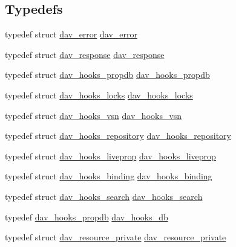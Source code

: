 \subsection*{Typedefs}
\begin{DoxyCompactItemize}
\item 
typedef struct \hyperlink{structdav__error}{dav\+\_\+error} \hyperlink{group__MOD__DAV_gaaca09776e4b1d7ae7844e1c331e4e152}{dav\+\_\+error}
\item 
typedef struct \hyperlink{structdav__response}{dav\+\_\+response} \hyperlink{group__MOD__DAV_ga2cd181241bc818bff9c2640de1e823e1}{dav\+\_\+response}
\item 
typedef struct \hyperlink{structdav__hooks__propdb}{dav\+\_\+hooks\+\_\+propdb} \hyperlink{group__MOD__DAV_gae0928279f0bc1535e8858e02527ee015}{dav\+\_\+hooks\+\_\+propdb}
\item 
typedef struct \hyperlink{structdav__hooks__locks}{dav\+\_\+hooks\+\_\+locks} \hyperlink{group__MOD__DAV_ga6693321785ea9339e16297428531d51d}{dav\+\_\+hooks\+\_\+locks}
\item 
typedef struct \hyperlink{structdav__hooks__vsn}{dav\+\_\+hooks\+\_\+vsn} \hyperlink{group__MOD__DAV_gad49c563d300f2c0c8a83916f375be9a7}{dav\+\_\+hooks\+\_\+vsn}
\item 
typedef struct \hyperlink{structdav__hooks__repository}{dav\+\_\+hooks\+\_\+repository} \hyperlink{group__MOD__DAV_ga23c20415a7a56d3ca00265c673bf3f7a}{dav\+\_\+hooks\+\_\+repository}
\item 
typedef struct \hyperlink{structdav__hooks__liveprop}{dav\+\_\+hooks\+\_\+liveprop} \hyperlink{group__MOD__DAV_ga866619ce3e7106716a7b418dc491b2f4}{dav\+\_\+hooks\+\_\+liveprop}
\item 
typedef struct \hyperlink{structdav__hooks__binding}{dav\+\_\+hooks\+\_\+binding} \hyperlink{group__MOD__DAV_gaf0e1094c9919b7bde611cbb9e2456f4e}{dav\+\_\+hooks\+\_\+binding}
\item 
typedef struct \hyperlink{structdav__hooks__search}{dav\+\_\+hooks\+\_\+search} \hyperlink{group__MOD__DAV_ga2506c1080f7dd94c91e54173fd51b586}{dav\+\_\+hooks\+\_\+search}
\item 
typedef \hyperlink{structdav__hooks__propdb}{dav\+\_\+hooks\+\_\+propdb} \hyperlink{group__MOD__DAV_gafb40434fe70df3d6b814d00757680507}{dav\+\_\+hooks\+\_\+db}
\item 
typedef struct \hyperlink{structdav__resource__private}{dav\+\_\+resource\+\_\+private} \hyperlink{group__MOD__DAV_ga42411ebc870b36ad29f4db65778aa6fe}{dav\+\_\+resource\+\_\+private}

\end{DoxyCompactItemize}
